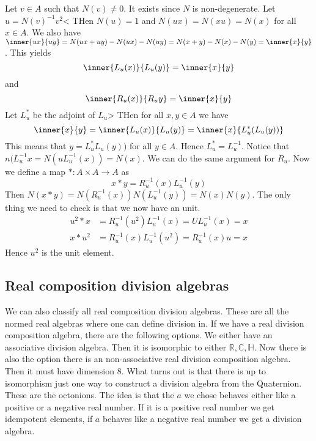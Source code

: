 \documentclass[../Thesis.tex]{subfiles}
\begin{document}
\begin{myproof}
Let $v \in A$ such that $N(v) \neq 0$. It exists since $N$ is non-degenerate. Let $u = N(v)^{-1}v^2$< THen $N(u) = 1$ and $N(ux) = N(xu) = N(x)$ for all $x \in A$. We also have $\inner{ux}{uy} = N(ux + uy) - N(ux) - N(uy) = N(x+y) - N(x) - N(y) = \inner{x}{y}$. This yields
\begin{equation}
\inner{L_u(x)}{L_u(y)} = \inner{x}{y}
\end{equation}
and
\begin{equation}
\inner{R_u(x)}{R_u{y}} = \inner{x}{y}
\end{equation}
Let $L_u^*$ be the adjoint of $L_u$> THen for all $x,y \in A$ we have
\begin{equation}
\inner{x}{y} = \inner{L_u(x)}{L_u(y)} = \inner{x}{L_u^*(L_u(y))}
\end{equation}
This means that $y = L_u^*L_u(y))$ for all $y \in A$. Hence $L_u^* = L_u^{-1}$.  Notice that $n(L_u^{-1}x  = N(uL_u^{-1}(x)) = N(x)$. We can do the same argument for $R_u$. Now we define a map $* : A \times A \rightarrow A$ as
\begin{equation}
x * y = R_u^{-1}(x)L_u^{-1}(y)
\end{equation}
Then $N(x * y) = N( R_u^{-1}(x))N(L_u^{-1}(y)) = N(x)N(y)$.
The only thing we need to check is that we now have an unit.
\begin{align*}
u^2 * x &= R_u^{-1}(u^2)L_u^{-1}(x) = UL_u^{-1}(x) = x\\
x * u^2 &= R_u^{-1}(x)L_u^{-1}(u^2) = R_u^{-1}(x) u =x
\end{align*}
Hence $u^2$ is the unit element. 
\end{myproof}
\subsection{Real composition division algebras}
We can also classify all real composition division algebras. These are all the normed real algebras where one can define division in. If we have a real division composition algebra, there are the following options. We either have an associative division algebra. Then it is isomorphic to either $\mathbb{R}, \mathbb{C}, \mathbb{H}$. Now there is also the option there is an non-associative real division composition algebra. Then it must have dimension $8$. What turns out is that there is up to isomorphism just one way to construct a division algebra from the Quaternion. These are the octonions. The idea is that the $a$ we chose behaves either like a positive or a negative real number. If it is a positive real number we get idempotent elements, if $a$ behaves like a negative real number we get a division algebra.
\end{document}
